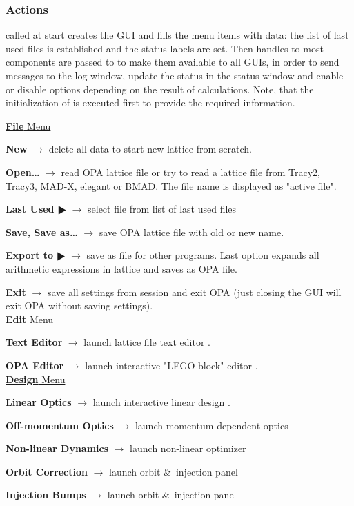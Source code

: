 \documentclass[12pt]{article}
\newcommand\code[1]{{\tt #1}}
\newcommand{\ofld}[1]{\colorbox{black!15}{{\bf #1}}}
\newcommand\guico[1]{{\color{blue}\code{#1}}}
\newcommand{\evcod}[2]{\ofld{#1} $\rightarrow$ \guico{#2}}
\newcommand{\opagui}[1]{\colorbox{blue!20}{{\color{black}\code{#1}}}}
\newcommand{\ogui}[1]{\hyperref[#1]{\opagui{#1}}}
\newcommand{\opauni}[1]{\colorbox{orange!30}{{\color{black}\code{#1}}}}
\newcommand{\ouni}[1]{\hyperref[#1]{\opauni{#1}}}
\newcommand{\act}[1]{\subsubsection*{Actions} #1}
\begin{document}
\act{
\guico{FormCreate} called at start creates the GUI and fills the menu items with data: the list of last used files is established and the status labels are set. Then handles to most components are passed to \ouni{globlib} to make them available to all GUIs, in order to send messages to the log window, update the status in the status window and enable or disable options depending on the result of calculations.
Note, that the initialization of \ouni{globlib} is executed first to provide the required information. 

\underline{\ofld{File} Menu}

\evcod{New}{fi\_new} delete all data to start new lattice from scratch.

\evcod{Open\dots}{fi\_open} read OPA lattice file or try to read a lattice  file from Tracy2, Tracy3, MAD-X, elegant or BMAD. The file name is displayed as "active file".

\evcod{Last Used $\RHD$}{fi\_last} select file from list of last used files

\evcod{Save, Save as\dots}{fi\_[save,svas]} save OPA lattice file with old or new name.

\evcod{Export to $\RHD$}{ex\_[tracy2,tracy,madx,elegant,bmad,opanovar]} save as file for other programs. Last option expands all arithmetic expressions in lattice and saves as OPA file.

\evcod{Exit}{fi\_exit} save all settings from session and exit OPA (just closing the GUI will exit OPA without saving settings).\\

\underline{\ofld{Edit} Menu}


\evcod{Text Editor}{ed\_text} launch lattice file text editor \ogui{opatexteditor}.

\evcod{OPA Editor}{ed\_oped} launch interactive "LEGO block" editor \ogui{opaeditor}.\\

\underline{\ofld{Design} Menu}

\evcod{Linear Optics}{ds\_opti} launch interactive linear design \ogui{opalinop}.

\evcod{Off-momentum Optics}{ds\_dppo}  launch momentum dependent optics \ogui{opamomentum}

\evcod{Non-linear Dynamics}{ds\_sext} launch non-linear optimizer \ogui{opachroma}

\evcod{Orbit Correction}{ds\_orbc} launch orbit \&\ injection panel \ogui{opaorbit}

\evcod{Injection Bumps}{ds\_injc } launch orbit \&\ injection panel  \ogui{opaorbit}

}
\end{document}
